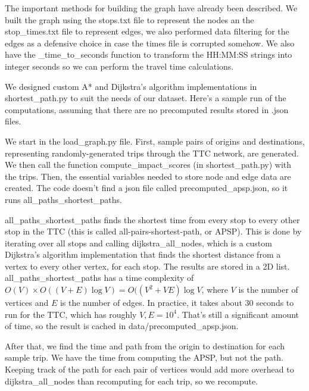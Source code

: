 \documentclass[fontsize=11pt]{article}
\begin{document}
\vspace{1em}

The important methods for building the graph have already been described. We built the graph using the stops.txt file to represent the nodes an the stop\_times.txt file to represent edges, we also performed data filtering for the edges as a defensive choice in case the times file is corrupted somehow. We also have the \_time\_to\_seconds function to transform the HH:MM:SS strings into integer seconds so we can perform the travel time calculations.


We designed custom A* and Dijkstra's algorithm implementations in shortest\_path.py to suit the needs of our dataset. Here's a sample run of the computations, assuming that there are no precomputed results stored in .json files. \newline

We start in the load\_graph.py file. First, sample pairs of origins and destinations, representing randomly-generated trips through the TTC network, are generated. We then call the function compute\_impact\_scores (in shortest\_path.py) with the trips. Then, the essential variables needed to store node and edge data are created. The code doesn't find a json file called precomputed\_apsp.json, so it runs all\_paths\_shortest\_paths. \newline

all\_paths\_shortest\_paths finds the shortest time from every stop to every other stop in the TTC (this is called all-pairs-shortest-path, or APSP). This is done by iterating over all stops and calling dijkstra\_all\_nodes, which is a custom Dijkstra's algorithm implementation that finds the shortest distance from a vertex to every other vertex, for each stop. The results are stored in a 2D list. all\_paths\_shortest\_paths has a time complexity of $O(V) \times O((V + E)\log{V}) = O((V^2 + VE)\log{V}$, where $V$ is the number of vertices and $E$ is the number of edges. In practice, it takes about 30 seconds to run for the TTC, which has roughly $V, E = 10^4$. That's still a significant amount of time, so the result is cached in data/precomputed\_apsp.json.
\newline

After that, we find the time and path from the origin to destination for each sample trip. We have the time from computing the APSP, but not the path. Keeping track of the path for each pair of vertices would add more overhead to dijkstra\_all\_nodes than recomputing for each trip, so we recompute. \newline
\end{document}
